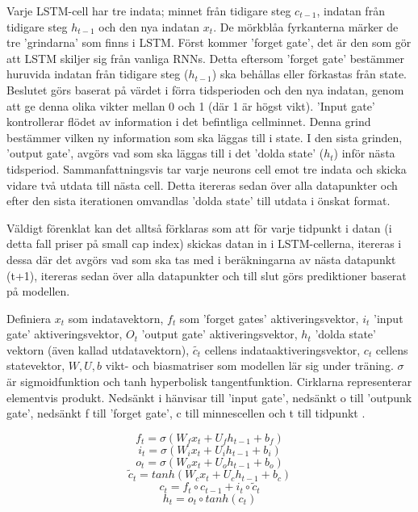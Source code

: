 \documentclass[12pt]{article}
\begin{document}
Varje LSTM-cell har tre indata; minnet från tidigare steg \(c_{t-1}\), indatan från tidigare steg \(h_{t-1}\) och den nya indatan \(x_{t}\). De mörkblåa fyrkanterna märker de tre 'grindarna' som finns i LSTM. Först kommer 'forget gate', det är den som gör att LSTM skiljer sig från vanliga RNNs. Detta eftersom 'forget gate' bestämmer huruvida indatan från tidigare steg (\(h_{t-1}\)) ska behållas eller förkastas från state. Beslutet görs baserat på värdet i förra tidsperioden och den nya indatan, genom att ge denna olika vikter mellan 0 och 1 (där 1 är högst vikt). 'Input gate' kontrollerar flödet av information i det befintliga cellminnet. Denna grind bestämmer vilken ny information som ska läggas till i state. I den sista grinden, 'output gate', avgörs vad som ska läggas till i det 'dolda state' (\(h_{t}\)) inför nästa tidsperiod. Sammanfattningsvis tar varje neurons cell emot tre indata och skicka vidare två utdata till nästa cell. Detta itereras sedan över alla datapunkter och efter den sista iterationen omvandlas 'dolda state' till utdata i önskat format. \parencite{purkait2019hands} \par
Väldigt förenklat kan det alltså förklaras som  att för varje tidpunkt i datan (i detta fall priser på small cap index) skickas datan in i LSTM-cellerna, itereras i dessa där det avgörs vad som ska tas med i beräkningarna av nästa datapunkt (t+1), itereras sedan över alla datapunkter och till slut görs prediktioner baserat på modellen. \par
Definiera \(x_t\) som indatavektorn, \(f_t\) som 'forget gates' aktiveringsvektor, \(i_t\) 'input gate' aktiveringsvektor, \(O_t\) 'output gate' aktiveringsvektor, \(h_t\) 'dolda state' vektorn (även kallad utdatavektorn), \(\tilde{c_t}\) cellens indataaktiveringsvektor, \(c_t\) cellens statevektor, \(W, U, b\) vikt- och biasmatriser som modellen lär sig under träning. \(\sigma\) är sigmoidfunktion och tanh hyperbolisk tangentfunktion. Cirklarna representerar elementvis produkt. Nedsänkt i hänvisar till 'input gate', nedsänkt o till 'outpunk gate', nedsänkt f till 'forget gate', c till minnescellen och t till tidpunkt \parencite{purkait2019hands}. 

\begin{equation}f_t = \sigma(W_f x_t + U_f h_{t-1} + b_f)\end{equation}
\begin{equation}i_t = \sigma(W_i x_t + U_i h_{t-1} + b_i)\end{equation}
\begin{equation}o_t = \sigma(W_o x_t + U_o h_{t-1} + b_o)\end{equation}
\begin{equation}\tilde{c}_t = tanh(W_c x_t + U_c h_{t-1} + b_c)\end{equation}
\begin{equation}c_t= f_t \circ c_{t-1} + i_t \circ \tilde{c}_t\end{equation}
\begin{equation}h_t= o_t \circ tanh(c_t)\end{equation}
\end{document}
